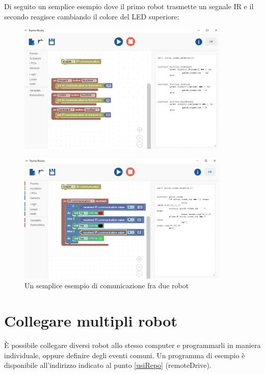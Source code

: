 \documentclass[12pt]{article}
\begin{document}
	Di seguito un semplice esempio dove il primo robot trasmette un segnale IR e il secondo reagisce cambiando il colore del LED superiore: 
	
	\begin{figure}[H]
		\centering
		\includegraphics[width=0.9\textwidth]{img/blocklyIR1.png}
		\label{blocklyIR1}
	\end{figure}
		
	\begin{figure}[H]
		\centering
		\includegraphics[width=0.9\textwidth]{img/blocklyIR2.png}
		\caption{Un semplice esempio di comunicazione fra due robot}
		\label{blocklyIR2}
	\end{figure}
	
	
\section{Collegare multipli robot}\label{multi-robot}

	È possibile collegare diversi robot allo stesso computer e programmarli in maniera individuale, oppure definire degli eventi comuni. Un programma di esempio è disponibile all'indirizzo indicato al punto \ref{usiRepo} (remoteDrive).
	
\end{document}
